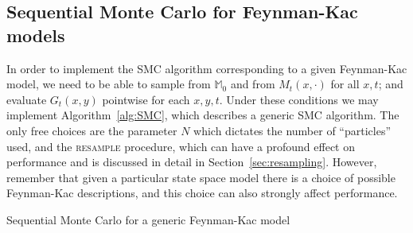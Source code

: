 \subsection{Sequential Monte Carlo for Feynman-Kac models}
\label{sec:SMC_FK}
In order to implement the SMC algorithm corresponding to a given Feynman-Kac model, we need to be able to sample from $\mathbb{M}_0$ and from $M_t(x, \cdot)$ for all $x,t$; and evaluate $G_t(x, y)$ pointwise for each $x,y, t$.
Under these conditions we may implement Algorithm~\ref{alg:SMC}, which describes a generic SMC algorithm. 
The only free choices are the parameter $N$ which dictates the number of ``particles'' used, and the \textsc{resample} procedure, which can have a profound effect on performance and is discussed in detail in Section~\ref{sec:resampling}.
However, remember that given a particular state space model there is a choice of possible Feynman-Kac descriptions, and this choice can also strongly affect performance.

\begin{algorithm}
\vspace*{10pt}
\DontPrintSemicolon
{}
\vspace*{10pt}
\caption{Sequential Monte Carlo for a generic Feynman-Kac model}
\label{alg:SMC}
\end{algorithm}

